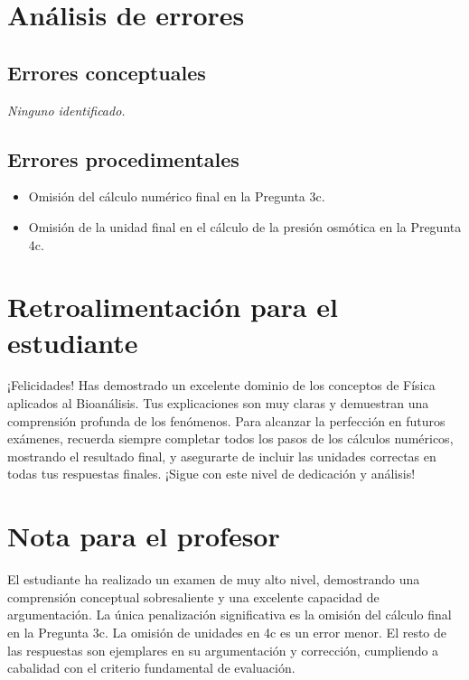\documentclass[11pt,a4paper]{article}
\begin{document}
\section*{Análisis de errores}

\subsection*{Errores conceptuales}
\textit{Ninguno identificado.}

\subsection*{Errores procedimentales}
\begin{itemize}[leftmargin=1.5em, itemsep=2pt]
  \item Omisión del cálculo numérico final en la Pregunta 3c.
  \item Omisión de la unidad final en el cálculo de la presión osmótica en la Pregunta 4c.
\end{itemize}

\section*{Retroalimentación para el estudiante}
\begin{tcolorbox}[cajaRecomendacion, title={Dirigido a: Estefani Santoya}]
¡Felicidades! Has demostrado un excelente dominio de los conceptos de Física aplicados al Bioanálisis. Tus explicaciones son muy claras y demuestran una comprensión profunda de los fenómenos. Para alcanzar la perfección en futuros exámenes, recuerda siempre completar todos los pasos de los cálculos numéricos, mostrando el resultado final, y asegurarte de incluir las unidades correctas en todas tus respuestas finales. ¡Sigue con este nivel de dedicación y análisis!
\end{tcolorbox}

\section*{Nota para el profesor}
\begin{tcolorbox}[
  enhanced, breakable,
  colback=yellow!8, colframe=yellow!60!black,
  fonttitle=\bfseries, coltitle=black,
  title={Observaciones para revisión manual},
  top=4pt, bottom=4pt, left=8pt, right=8pt,
]
El estudiante ha realizado un examen de muy alto nivel, demostrando una comprensión conceptual sobresaliente y una excelente capacidad de argumentación. La única penalización significativa es la omisión del cálculo final en la Pregunta 3c. La omisión de unidades en 4c es un error menor. El resto de las respuestas son ejemplares en su argumentación y corrección, cumpliendo a cabalidad con el criterio fundamental de evaluación.
\end{tcolorbox}
\end{document}
